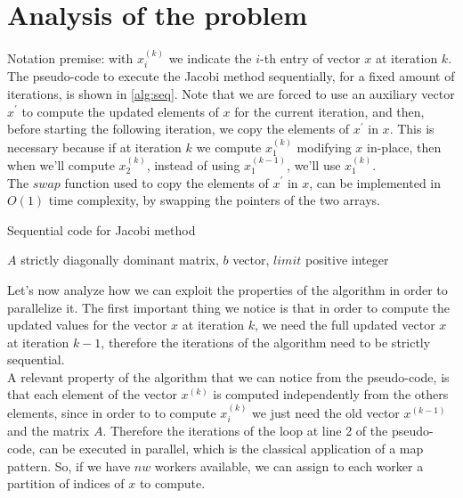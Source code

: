 \documentclass[12pt]{article}
\begin{document}
	\section{Analysis of the problem}
	Notation premise: with $x_i^{(k)}$ we indicate the $i$-th entry of vector $x$ at iteration $k$. The pseudo-code to execute the Jacobi method sequentially, for a fixed amount of iterations, is shown in \ref{alg:seq}. Note that we are forced to use an auxiliary vector $x^\prime$ to compute the updated elements of $x$ for the current iteration, and then, before starting the following iteration, we copy the elements of $x^\prime$ in $x$. This is necessary because if at iteration $k$ we compute $x^{(k)}_1$ modifying $x$ in-place, then when we'll compute $x^{(k)}_2$, instead of using $x^{(k-1)}_1$, we'll use $x^{(k)}_1$.\\
	The $swap$ function used to copy the elements of $x^\prime$ in $x$, can be implemented in $O(1)$ time complexity, by swapping the pointers of the two arrays.
	\begin{algorithm}[H]
		\caption{Sequential code for Jacobi method}\label{alg:seq}
		\begin{algorithmic}[1]
			\Require $A$ strictly diagonally dominant matrix, $b$ vector, $limit$ positive integer
			\EndIf
			\EndFor
			\EndFor
			\EndFor
		\end{algorithmic}
	\end{algorithm}
	\noindent Let's now analyze how we can exploit the properties of the algorithm in order to parallelize it. The first important thing we notice is that in order to compute the updated values for the vector $x$ at iteration $k$, we need the full updated vector $x$ at iteration $k-1$, therefore the iterations of the algorithm need to be strictly sequential.\\
	A relevant property of the algorithm that we can notice from the pseudo-code, is that each element of the vector $x^{(k)}$ is computed independently from the others elements, since in order to to compute $x_i^{(k)}$ we just need the old vector $x^{(k-1)}$ and the matrix $A$. Therefore the iterations of the loop at line 2 of the pseudo-code, can be executed in parallel, which is the classical application of a map pattern. So, if we have $nw$ workers available, we can assign to each worker a partition of indices of $x$ to compute.\\
\end{document}
